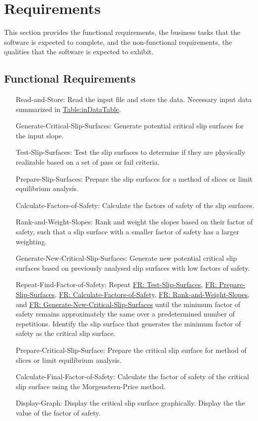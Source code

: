\documentclass[12pt]{article}
\begin{document}
\section{Requirements}
\label{Sec:Requirements}
This section provides the functional requirements, the business tasks that the software is expected to complete, and the non-functional requirements, the qualities that the software is expected to exhibit.
\subsection{Functional Requirements}
\label{Sec:FRs}
\begin{itemize}
\item[Read-and-Store:\phantomsection\label{readAndStore}]Read the input file and store the data. Necessary input data summarized in \hyperref[Table:inDataTable]{Table:inDataTable}.
\item[Generate-Critical-Slip-Surfaces:\phantomsection\label{generateCSS}]Generate potential critical slip surfaces for the input slope.
\item[Test-Slip-Surfaces:\phantomsection\label{testSlipSrf}]Test the slip surfaces to determine if they are physically realizable based on a set of pass or fail criteria.
\item[Prepare-Slip-Surfaces:\phantomsection\label{prepareSlipS}]Prepare the slip surfaces for a method of slices or limit equilibrium analysis.
\item[Calculate-Factors-of-Safety:\phantomsection\label{calculateFS}]Calculate the factors of safety of the slip surfaces.
\item[Rank-and-Weight-Slopes:\phantomsection\label{rankSlope}]Rank and weight the slopes based on their factor of safety, such that a slip surface with a smaller factor of safety has a larger weighting.
\item[Generate-New-Critical-Slip-Surfaces:\phantomsection\label{generateCSS'}]Generate new potential critical slip surfaces based on previously analysed slip surfaces with low factors of safety.
\item[Repeat-Find-Factor-of-Safety:\phantomsection\label{repeatFindFS}]Repeat \hyperref[testSlipSrf]{FR: Test-Slip-Surfaces}, \hyperref[prepareSlipS]{FR: Prepare-Slip-Surfaces}, \hyperref[calculateFS]{FR: Calculate-Factors-of-Safety}, \hyperref[rankSlope]{FR: Rank-and-Weight-Slopes}, and \hyperref[generateCSS']{FR: Generate-New-Critical-Slip-Surfaces} until the minimum factor of safety remains approximately the same over a predetermined number of repetitions. Identify the slip surface that generates the minimum factor of safety as the critical slip surface.
\item[Prepare-Critical-Slip-Surface:\phantomsection\label{prepareCSS}]Prepare the critical slip surface for method of slices or limit equilibrium analysis.
\item[Calculate-Final-Factor-of-Safety:\phantomsection\label{calculateFS'}]Calculate the factor of safety of the critical slip surface using the Morgenstern-Price method.
\item[Display-Graph:\phantomsection\label{displayGraph}]Display the critical slip surface graphically. Display the the value of the factor of safety.
\end{itemize}
\end{document}

